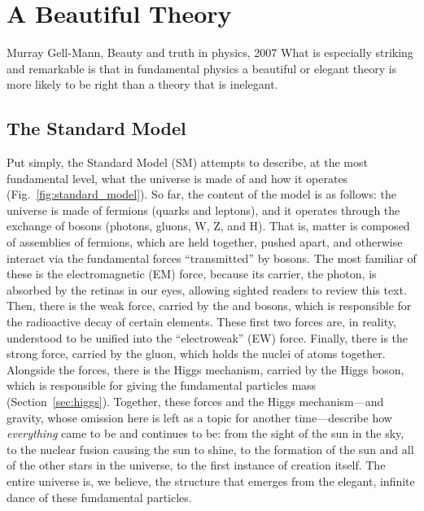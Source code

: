 \chapter{A Beautiful Theory}
\begin{aquote}{Murray Gell-Mann, Beauty and truth in physics, 2007}
    What is especially striking and remarkable is that in fundamental physics 
    a beautiful or elegant theory is more likely to be right 
    than a theory that is inelegant.
\end{aquote}

\section{The Standard Model}
Put simply, the Standard Model (SM) attempts to describe, at the most fundamental level, what the universe is made of and how it operates (Fig.~\ref{fig:standard_model}). 
So far, the content of the model is as follows: the universe is made of fermions (quarks and leptons), and it operates through the exchange of bosons (photons, gluons, W, Z, and H). 
That is, matter\footnotemark{} is composed of assemblies of fermions, which are held together, pushed apart, and otherwise interact via the fundamental forces ``transmitted'' by bosons. 
The most familiar of these is the electromagnetic (EM) force, because its carrier, the photon, is absorbed by the retinas in our eyes, allowing sighted readers to review this text. 
Then, there is the weak force, carried by the \PW and \PZ bosons, which is responsible for the radioactive decay of certain elements. 
These first two forces are, in reality, understood to be unified into the ``electroweak'' (EW) force. 
Finally, there is the strong force, carried by the gluon, which holds the nuclei of atoms together. 
Alongside the forces, there is the Higgs mechanism, carried by the Higgs boson, which is responsible for giving the fundamental particles mass (Section~\ref{sec:higgs}). 
Together, these forces and the Higgs mechanism---and gravity, whose omission here is left as a topic for another time---describe how \textit{everything} came to be and continues to be: from the sight of the sun in the sky, to the nuclear fusion causing the sun to shine, to the formation of the sun and all of the other stars in the universe, to the first instance of creation itself. 
The entire universe is, we believe, the structure that emerges from the elegant, infinite dance of these fundamental particles. 

